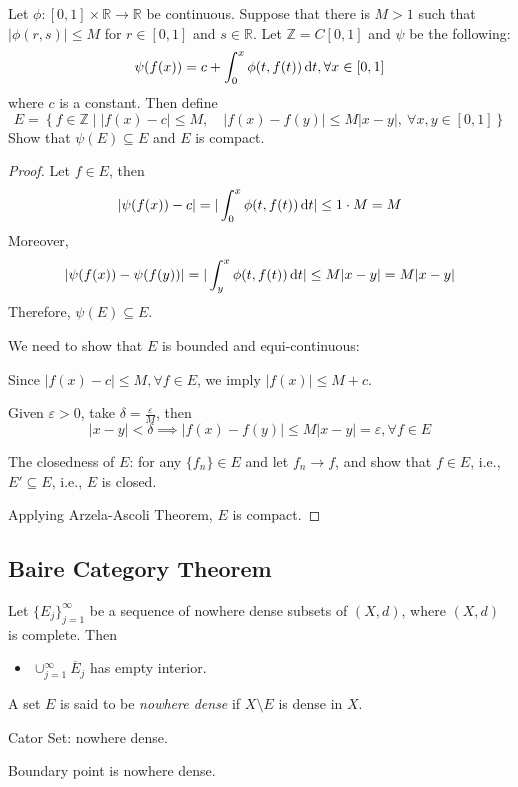 \begin{example}
Let $\phi:[0,1]\times\mathbb{R}\to\mathbb{R}$ be continuous. Suppose that there is $M>1$ such that 
$|\phi(r,s)|\le M$ for $r\in[0,1]$ and $s\in\mathbb{R}$.
Let $\mathbb{Z} = C[0,1]$ and $\psi$ be the following:
\[
\psi(f(x)) = c + \int_0^x\phi(t,f(t))\,\mathrm{d} t,\forall x\in[0,1]
\]
where $c$ is a constant.
Then define
\[
E = \left\{f\in\mathbb{Z}\middle|
|f(x)-c|\le M,\quad
|f(x)-f(y)|\le M|x-y|,\ \forall x,y\in[0,1]
\right\}
\]
Show that $\psi(E)\subseteq E$ and $E$ is compact.
\end{example}
\begin{proof}
Let $f\in E$, then
\[
|\psi(f(x)) - c|=|\int_0^x\phi(t,f(t))\,\mathrm{d} t|\le 1\cdot M = M
\]
Moreover,
\[
|\psi(f(x)) - \psi(f(y))|=|\int_y^x\phi(t,f(t))\,\mathrm{d} t|\le M|x-y|=M|x-y|
\]
Therefore, $\psi(E)\subseteq E$.

We need to show that $E$ is bounded and equi-continuous:

Since $|f(x)-c|\le M,\forall f\in E$, we imply $|f(x)|\le M+c$.

Given $\varepsilon>0$, take $\delta = \frac{\varepsilon}{M}$, then 
\[
|x-y|<\delta\implies|f(x) - f(y)|\le M|x-y|=\varepsilon,\forall f\in E
\]

The closedness of $E$:
for any $\{f_n\}\in E$ and let $f_n\to f$, and show that $f\in E$, i.e., $E'\subseteq E$, i.e., $E$ is closed.

Applying Arzela-Ascoli Theorem, $E$ is compact.
\end{proof}

\subsection{Baire Category Theorem}
Let $\{E_j\}_{j=1}^\infty$ be a sequence of nowhere dense subsets of $(X,d)$, where $(X,d)$ is complete.
Then
\begin{itemize}
\item
$\cup_{j=1}^\infty \overline{E}_j$ has empty interior.
\end{itemize}

\begin{definition}
A set $E$ is said to be \emph{nowhere dense} if $X\setminus E$ is dense in $X$.
\end{definition}
Cator Set: nowhere dense.

Boundary point is nowhere dense.

